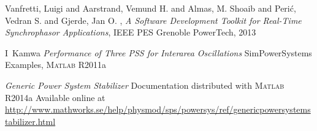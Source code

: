 \documentclass[conference]{IEEEtran}
\begin{document}
\begin{thebibliography}{1}
 Vanfretti, Luigi and Aarstrand, Vemund H. and Almas, M. Shoaib and Peri\'c, Vedran S. and Gjerde, Jan O. , \emph{A Software Development Toolkit for Real-Time Synchrophasor Applications},  IEEE PES Grenoble PowerTech, 2013

 I~Kamwa \emph{Performance of Three PSS for Interarea Oscillations} SimPowerSystems Examples, \textsc{Matlab} R2011a

 \emph{Generic Power System Stabilizer} Documentation distributed with \textsc{Matlab} R2014a Available online at \url{http://www.mathworks.se/help/physmod/sps/powersys/ref/genericpowersystemstabilizer.html}

\end{thebibliography}




\end{document}
